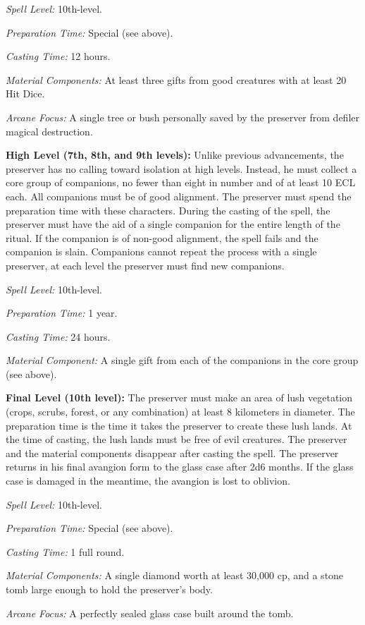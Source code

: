 {\textit{Spell Level:} 10th-level.

\textit{Preparation Time:} Special (see above).

\textit{Casting Time:} 12 hours.

\textit{Material Components:} At least three gifts from good creatures with at least 20 Hit Dice.

\textit{Arcane Focus:} A single tree or bush personally saved by the preserver from defiler magical destruction.

\textbf{High Level (7th, 8th, and 9th levels):} Unlike previous advancements, the preserver has no calling toward isolation at high levels. Instead, he must collect a core group of companions, no fewer than eight in number and of at least 10 ECL each. All companions must be of good alignment. The preserver must spend the preparation time with these characters. During the casting of the spell, the preserver must have the aid of a single companion for the entire length of the ritual. If the companion is of non-good alignment, the spell fails and the companion is slain. Companions cannot repeat the process with a single preserver, at each level the preserver must find new companions.

\textit{Spell Level:} 10th-level.

\textit{Preparation Time:} 1 year.

\textit{Casting Time:} 24 hours.

\textit{Material Component:} A single gift from each of the companions in the core group (see above).

\textbf{Final Level (10th level):} The preserver must make an area of lush vegetation (crops, scrubs, forest, or any combination) at least 8 kilometers in diameter. The preparation time is the time it takes the preserver to create these lush lands. At the time of casting, the lush lands must be free of evil creatures. The preserver and the material components disappear after casting the spell. The preserver returns in his final avangion form to the glass case after 2d6 months. If the glass case is damaged in the meantime, the avangion is lost to oblivion.

\textit{Spell Level:} 10th-level.

\textit{Preparation Time:} Special (see above).

\textit{Casting Time:} 1 full round.

\textit{Material Components:} A single diamond worth at least 30,000 cp, and a stone tomb large enough to hold the preserver's body.

\textit{Arcane Focus:} A perfectly sealed glass case built around the tomb.
}
